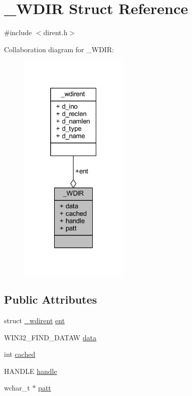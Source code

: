 \hypertarget{struct___w_d_i_r}{\section{\+\_\+\+W\+D\+I\+R Struct Reference}
\label{struct___w_d_i_r}
}


{\ttfamily \#include $<$dirent.\+h$>$}



Collaboration diagram for \+\_\+\+W\+D\+I\+R\+:\nopagebreak
\begin{figure}[H]
\begin{center}
\leavevmode
\includegraphics[width=148pt]{struct___w_d_i_r__coll__graph}
\end{center}
\end{figure}
\subsection*{Public Attributes}
\begin{DoxyCompactItemize}
\item 
struct \hyperlink{struct__wdirent}{\+\_\+wdirent} \hyperlink{struct___w_d_i_r_a84ae1457352005f813ed4b3dc1994b62}{ent}
\item 
W\+I\+N32\+\_\+\+F\+I\+N\+D\+\_\+\+D\+A\+T\+A\+W \hyperlink{struct___w_d_i_r_a065b17b666ee06c4e8068d8accb0eef9}{data}
\item 
int \hyperlink{struct___w_d_i_r_a9b7432df163d1e291ba5925347fd4af3}{cached}
\item 
H\+A\+N\+D\+L\+E \hyperlink{struct___w_d_i_r_a694510e166fd3e797b3e15b9e4b3810a}{handle}
\item 
wchar\+\_\+t $\ast$ \hyperlink{struct___w_d_i_r_a700ff3a1096fb36452c571b0f55b4e60}{patt}
\end{DoxyCompactItemize}


